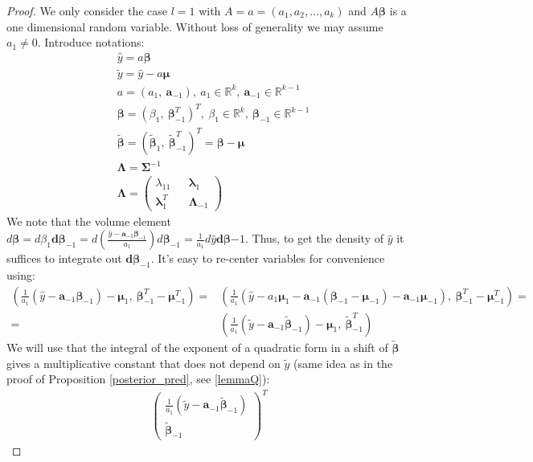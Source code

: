 \documentclass[10pt,fleqn]{amsart}
\theoremstyle{definition}
\theoremstyle{remark}
\numberwithin{equation}{section}
\newcommand{\aaa}{\boldsymbol{a}}
\newcommand{\RR}{\mathbb{R}}
\newcommand{\bbeta}{\boldsymbol{\beta}}
\newcommand{\mmu}{\boldsymbol{\mu}}
\newcommand{\SSigma}{\boldsymbol{\Sigma}}
\newcommand{\llambda}{\boldsymbol{\lambda}}
\newcommand{\LLambda}{\boldsymbol{\Lambda}}
\newcommand{\bbetatilde}{\widetilde{\bbeta}}
\newcommand{\yhat}{\widehat{y}}
\newcommand{\ytilde}{\widetilde{y}}
\begin{document}
\begin{proof} We only consider the case $l=1$ with $A=a=(a_1, a_2,\ldots, a_k)$ and $A\bbeta$ is a one dimensional random variable.
Without loss of generality we may assume $a_1\neq 0$. Introduce notations:
\begin{align}
    &\yhat = a\bbeta\\
    &\ytilde=\yhat-a\mmu\\
    &a = \left(a_1,\ \aaa_{-1}\right),\ a_1\in\RR^k,\ \aaa_{-1}\in\RR^{k-1}\\
    &\bbeta = \left(\beta_1,\ \bbeta_{-1}^T\right)^T,\ \beta_1\in\RR^k,\ \bbeta_{-1}\in\RR^{k-1}\\
    &\bbetatilde=\left(\bbetatilde_1,\ \bbetatilde_{-1}^T\right)^T=\bbeta-\mmu\\
    &\LLambda=\SSigma^{-1}\\
    &\LLambda=\left(\begin{matrix}
        \lambda_{11} && \llambda_1\\
        \llambda_1^T && \LLambda_{-1}
    \end{matrix}\right)
\end{align}
We note that the volume element
$\displaystyle d\bbeta=d\beta_1\boldsymbol{d}\bbeta_{-1}=d\left(\frac{\yhat-\aaa_{-1}\bbeta_{-1}}{a_1}\right)d\bbeta_{-1}=\frac 1{a_1}d\yhat\boldsymbol{d}\bbeta{-1}$.
Thus, to get the density of $\yhat$ it suffices to integrate out $\boldsymbol{d}\bbeta_{-1}$. It's easy to re-center variables for convenience using:
\begin{equation*}\begin{split}
    \left(\frac{1}{a_1}\left(\yhat-\aaa_{-1}\bbeta_{-1}\right)-\mmu_1,\ \bbeta_{-1}^T-\mmu_{-1}^T\right)=&\left(\frac{1}{a_1}\left(\yhat-a_1\mmu_1-\aaa_{-1}\left(\bbeta_{-1}-\mmu_{-1}\right)-\aaa_{-1}\mmu_{-1}\right),\ \bbeta_{-1}^T-\mmu_{-1}^T\right)=\\
    =&\left(\frac{1}{a_1}\left(\ytilde-\aaa_{-1}\bbetatilde_{-1}\right)-\mmu_1,\ \bbetatilde_{-1}^T\right)
\end{split}\end{equation*}
We will use that the integral of the exponent of a quadratic form in a shift of $\bbetatilde$ gives a multiplicative constant that
does not depend on $\ytilde$
(same idea as in the proof of Proposition \ref{posterior_pred}, see \ref{lemmaQ}):
\begin{equation*}\begin{split}
    \left(\begin{matrix}\frac 1{a_1}\left(\ytilde-\aaa_{-1}\bbetatilde_{-1}\right)\\\bbetatilde_{-1}\end{matrix}\right)^T

\end{split}
\end{equation*}
\end{proof}
\end{document}
